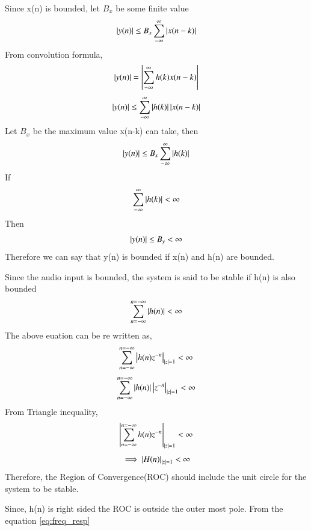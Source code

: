 \documentclass[journal,12pt,twocolumn]{IEEEtran}
\renewcommand\thesection{\arabic{section}}
\begin{document}
\begin{enumerate}[label=\thesection.\arabic*,ref=\thesection.\theenumi]
Since x(n) is bounded, let $B_{x}$ be some finite value
\begin{equation}
\left\vert y(n)\right\vert \leq B_{x}\sum_{-\infty}^{\infty} \left\vert x(n-k)\right\vert
\end{equation}
From convolution formula,
\begin{equation}
\left\vert y(n)\right\vert = \left\vert\sum_{-\infty}^{\infty} h(k)x(n-k)\right\vert
\end{equation}
\begin{equation}
\left\vert y(n)\right\vert \leq \sum_{-\infty}^{\infty} \left\vert h(k)\right\vert\left\vert x(n-k)\right\vert
\end{equation}
Let $B_{x}$ be the maximum value x(n-k) can take, then
\begin{equation}
\left\vert y(n)\right\vert \leq B_{x}\sum_{-\infty}^{\infty} \left\vert h(k)\right\vert
\end{equation}
If
\begin{equation}
\sum_{-\infty}^{\infty} \left\vert h(k)\right\vert < \infty
\end{equation}
Then
\begin{equation}
\left\vert y(n)\right\vert \leq B_{y} < \infty
\end{equation}
Therefore we can say that y(n) is bounded if x(n) and h(n) are bounded.

Since the audio input is bounded, the system is said to be stable if h(n) is also bounded
\begin{equation}
\sum_{n=-\infty}^{n=-\infty} \left\vert h(n)\right\vert<\infty
\end{equation}
The above euation can be re written as,
\begin{equation}
\sum_{n=-\infty}^{n=-\infty} \left\vert h(n)z^{-n}\right\vert_{\left\vert z\right\vert=1}<\infty
\end{equation}
\begin{equation}
\sum_{n=-\infty}^{n=-\infty} \left\vert h(n)\right\vert \left\vert z^{-n}\right\vert_{\left\vert z\right\vert=1}<\infty
\end{equation}
From Triangle inequality,
\begin{equation}
\left\vert\sum_{n=-\infty}^{n=-\infty} h(n)z^{-n}\right\vert_{\left\vert z\right\vert=1}<\infty
\end{equation}
\begin{equation}
\implies \left\vert H(n)\right\vert_{\left\vert z\right\vert=1} < \infty
\end{equation}
Therefore, the Region of Convergence(ROC) should include the unit circle for the system to be stable.

Since, h(n) is right sided the ROC is outside the outer most pole. From the equation \eqref{eq:freq_resp}


\end{enumerate}
\end{document}
